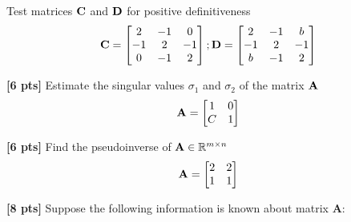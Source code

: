 \documentclass[11pt,addpoints,answers]{exam}
\numberwithin{equation}{section} %
\numberwithin{figure}{section} %
\numberwithin{table}{section} %
\begin{document}
\begin{questions}
    Test matrices $\mathbf{C}$ and $\mathbf{D}$ for positive definitiveness
    \begin{align*}
        \mathbf{C}=\begin{bmatrix}
                 2 & -1 & 0 \\
                 -1 & 2 & -1 \\
                 0 & -1 & 2
                \end{bmatrix};
        \mathbf{D}=\begin{bmatrix}
                 2 & -1 & b \\
                 -1 & 2 & -1 \\
                 b & -1 & 2
                \end{bmatrix}
    \end{align*}
    \begin{tcolorbox}[fit,height=3cm, width=\textwidth, blank, borderline={0.5pt}{-2pt},halign=center, valign=center, nobeforeafter]
    \end{tcolorbox}


    \question \textbf{[6 pts]}   Estimate the singular values $\sigma_1$ and $\sigma_2$ of the matrix $\mathbf{A}$
    \begin{align*}
        \mathbf{A} = \begin{bmatrix}
            1 & 0 \\ C & 1
        \end{bmatrix}
    \end{align*}

    \begin{tcolorbox}[fit,height=2cm, width=\textwidth, blank, borderline={0.5pt}{-2pt},halign=center, valign=center, nobeforeafter]
    \end{tcolorbox}

    \question \textbf{[6 pts]}  Find the pseudoinverse of $\mathbf{A} \in \mathbb{R}^{m \times n}$
    \begin{align*}
        \mathbf{A} = \begin{bmatrix}
            2 & 2 \\ 1 & 1
        \end{bmatrix}
    \end{align*}
    \begin{tcolorbox}[fit,height=2cm, width=\textwidth, blank, borderline={0.5pt}{-2pt},halign=center, valign=center, nobeforeafter]
    \end{tcolorbox}

    \question \textbf{[8 pts]} Suppose the following information is known about matrix $\mathbf{A}$:
    

\end{questions}
\end{document}
